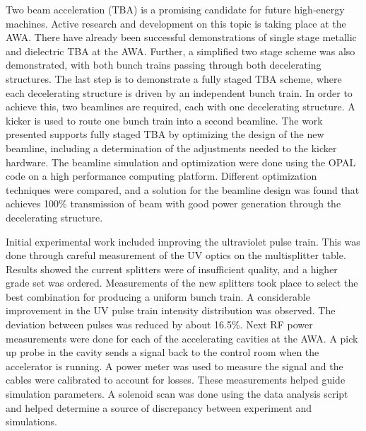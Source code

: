 
Two beam acceleration (TBA) is a promising candidate for future high-energy machines. Active research and development on this topic is taking place at the AWA. There have already been successful demonstrations of single stage metallic and dielectric 
TBA at the AWA. Further, a simplified two stage scheme was also demonstrated, with both bunch trains passing through both decelerating structures. 
The last step is to demonstrate a fully staged TBA scheme, where each decelerating structure is driven by an independent bunch train.  In order to achieve this, two beamlines are required, each with one decelerating structure.   A kicker is used to route one bunch train into a second beamline. The work presented supports fully staged TBA by optimizing the design of the new beamline, including a determination of the adjustments needed to the kicker hardware.  The beamline simulation and optimization were done using the OPAL code on a high performance computing platform.  Different optimization techniques were compared, and a solution for the beamline design was found that achieves 100\% transmission of beam with good power generation through the decelerating structure. 

Initial experimental work included improving the ultraviolet pulse train. This was done through careful measurement of the UV optics on the multisplitter table. Results showed the current splitters were of insufficient quality, and a higher grade set was ordered. Measurements of the new splitters took place 
to select the best combination for producing a uniform bunch train.
A considerable improvement in the UV pulse train intensity distribution was observed. The deviation between pulses was reduced by about 16.5\%.
Next RF power measurements were done for each of the accelerating 
cavities at the AWA. A pick up probe in the cavity sends a signal back to the control room when the accelerator is running. A power meter was used to measure the signal and the cables were calibrated to account for losses.  These measurements helped guide simulation parameters. A solenoid scan was done using the data analysis script
and helped determine a source of discrepancy between experiment and 
simulations.

